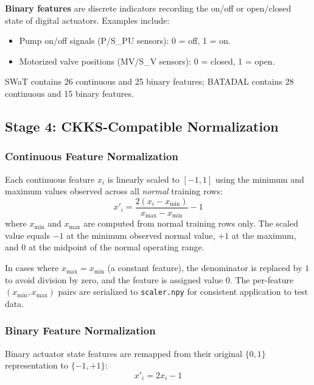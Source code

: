 \textbf{Binary features} are discrete indicators recording the on/off or
open/closed state of digital actuators. Examples include:
\begin{itemize}
  \item Pump on/off signals (P/S\_PU sensors): 0 = off, 1 = on.
  \item Motorized valve positions (MV/S\_V sensors): 0 = closed, 1 = open.
\end{itemize}

SWaT contains 26 continuous and 25 binary features; BATADAL contains 28
continuous and 15 binary features.

\subsection{Stage 4: CKKS-Compatible Normalization}

\subsubsection{Continuous Feature Normalization}

Each continuous feature $x_i$ is linearly scaled to $[-1, 1]$ using the
minimum and maximum values observed across all \textit{normal} training rows:
\begin{equation}
  x'_i = \frac{2(x_i - x_{\min})}{x_{\max} - x_{\min}} - 1
  \label{eq:normalization}
\end{equation}
where $x_{\min}$ and $x_{\max}$ are computed from normal training rows only.
The scaled value equals $-1$ at the minimum observed normal value, $+1$ at the
maximum, and $0$ at the midpoint of the normal operating range.

In cases where $x_{\max} = x_{\min}$ (a constant feature), the denominator is
replaced by $1$ to avoid division by zero, and the feature is assigned value $0$.
The per-feature $(x_{\min}, x_{\max})$ pairs are serialized to
\texttt{scaler.npy} for consistent application to test data.

\subsubsection{Binary Feature Normalization}

Binary actuator state features are remapped from their original $\{0, 1\}$
representation to $\{-1, +1\}$:
\begin{equation}
  x'_i = 2x_i - 1
  \label{eq:binary_norm}
\end{equation}

